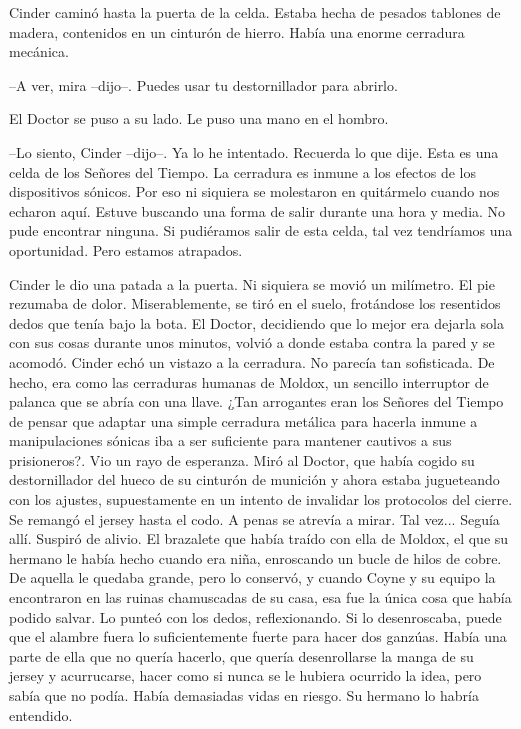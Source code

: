 Cinder caminó hasta la puerta de la celda. Estaba hecha de pesados tablones de madera, contenidos en un cinturón de hierro. Había una enorme cerradura mecánica.

--A ver, mira --dijo--. Puedes usar tu destornillador para abrirlo.

El Doctor se puso a su lado. Le puso una mano en el hombro.

--Lo siento, Cinder --dijo--. Ya lo he intentado. Recuerda lo que dije. Esta es una celda de los Señores del Tiempo. La cerradura es inmune a los efectos de los dispositivos sónicos. Por eso ni siquiera se molestaron en quitármelo cuando nos echaron aquí. Estuve buscando una forma de salir durante una hora y media. No pude encontrar ninguna. Si pudiéramos salir de esta celda, tal vez tendríamos una oportunidad. Pero estamos atrapados.

Cinder le dio una patada a la puerta. Ni siquiera se movió un milímetro. El pie rezumaba de dolor. Miserablemente, se tiró en el suelo, frotándose los resentidos dedos que tenía bajo la bota. El Doctor, decidiendo que lo mejor era dejarla sola con sus cosas durante unos minutos, volvió a donde estaba contra la pared y se acomodó.
Cinder echó un vistazo a la cerradura. No parecía tan sofisticada. De hecho, era como las cerraduras humanas de Moldox, un sencillo interruptor de palanca que se abría con una llave. ¿Tan arrogantes eran los Señores del Tiempo de pensar que adaptar una simple cerradura metálica para hacerla inmune a manipulaciones sónicas iba a ser suficiente para mantener cautivos a sus prisioneros?.
Vio un rayo de esperanza. Miró al Doctor, que había cogido su destornillador del hueco de su cinturón de munición y ahora estaba jugueteando con los ajustes, supuestamente en un intento de invalidar los protocolos del cierre.
Se remangó el jersey hasta el codo. A penas se atrevía a mirar. Tal vez...
Seguía allí. Suspiró de alivio. El brazalete que había traído con ella de Moldox, el que su hermano le había hecho cuando era niña, enroscando un bucle de hilos de cobre. De aquella le quedaba grande, pero lo conservó, y cuando Coyne y su equipo la encontraron en las ruinas chamuscadas de su casa, esa fue la única cosa que había podido salvar.
Lo punteó con los dedos, reflexionando. Si lo desenroscaba, puede que el alambre fuera lo suficientemente fuerte para hacer dos ganzúas. Había una parte de ella que no quería hacerlo, que quería desenrollarse la manga de su jersey y acurrucarse, hacer como si nunca se le hubiera ocurrido la idea, pero sabía que no podía. Había demasiadas vidas en riesgo. Su hermano lo habría entendido.

